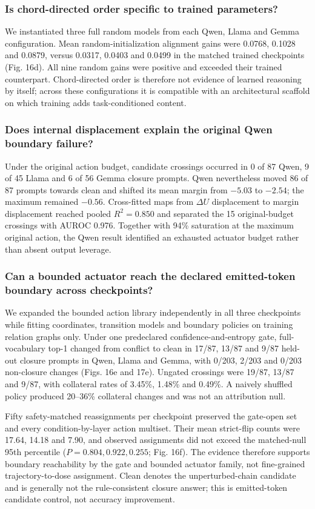 \documentclass[11pt]{article}
\begin{document}
\subsubsection*{Is chord-directed order specific to trained parameters?}
We instantiated three full random models from each Qwen, Llama and Gemma configuration. Mean random-initialization alignment gains were 0.0768, 0.1028 and 0.0879, versus 0.0317, 0.0403 and 0.0499 in the matched trained checkpoints (Fig. 16d). All nine random gains were positive and exceeded their trained counterpart. Chord-directed order is therefore not evidence of learned reasoning by itself; across these configurations it is compatible with an architectural scaffold on which training adds task-conditioned content.

\subsubsection*{Does internal displacement explain the original Qwen boundary failure?}
Under the original action budget, candidate crossings occurred in 0 of 87 Qwen, 9 of 45 Llama and 6 of 56 Gemma closure prompts. Qwen nevertheless moved 86 of 87 prompts towards clean and shifted its mean margin from $-5.03$ to $-2.54$; the maximum remained $-0.56$. Cross-fitted maps from $\Delta U$ displacement to margin displacement reached pooled $R^2=0.850$ and separated the 15 original-budget crossings with AUROC 0.976. Together with 94\% saturation at the maximum original action, the Qwen result identified an exhausted actuator budget rather than absent output leverage.

\subsubsection*{Can a bounded actuator reach the declared emitted-token boundary across checkpoints?}
We expanded the bounded action library independently in all three checkpoints while fitting coordinates, transition models and boundary policies on training relation graphs only. Under one predeclared confidence-and-entropy gate, full-vocabulary top-1 changed from conflict to clean in 17/87, 13/87 and 9/87 held-out closure prompts in Qwen, Llama and Gemma, with 0/203, 2/203 and 0/203 non-closure changes (Figs. 16e and 17e). Ungated crossings were 19/87, 13/87 and 9/87, with collateral rates of 3.45\%, 1.48\% and 0.49\%. A naively shuffled policy produced 20--36\% collateral changes and was not an attribution null.

Fifty safety-matched reassignments per checkpoint preserved the gate-open set and every condition-by-layer action multiset. Their mean strict-flip counts were 17.64, 14.18 and 7.90, and observed assignments did not exceed the matched-null 95th percentile ($P=0.804,0.922,0.255$; Fig. 16f). The evidence therefore supports boundary reachability by the gate and bounded actuator family, not fine-grained trajectory-to-dose assignment. Clean denotes the unperturbed-chain candidate and is generally not the rule-consistent closure answer; this is emitted-token candidate control, not accuracy improvement.
\end{document}
